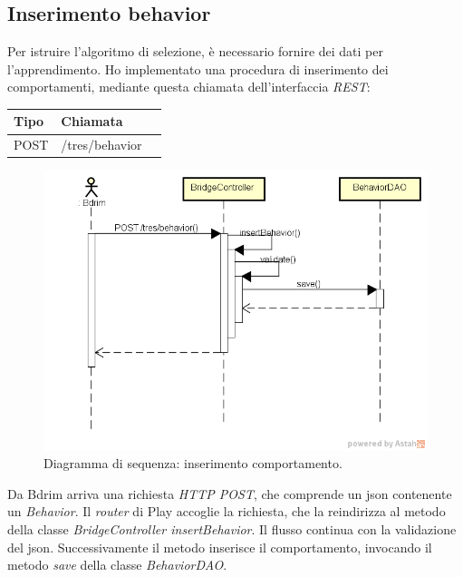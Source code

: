 \subsection{Inserimento behavior}
Per istruire l'algoritmo di selezione, è necessario fornire dei dati per l'apprendimento. Ho implementato una procedura di inserimento dei comportamenti, mediante questa chiamata dell'interfaccia \emph{REST}:
\def\arraystretch{1.5}
\begin{longtable}{|p{2.5cm}|p{5cm}|l|}
\hline
\textbf{Tipo} &	\textbf{Chiamata}	\\\hline
POST	&	/tres/behavior	 \\\hline
\end{longtable}
\begin{figure}[h]
\centering
\includegraphics[scale=0.42]{immagini/DSinsertBeh}
\caption{Diagramma di sequenza: inserimento comportamento.}
\label{fig:seq-inserimentobeh}
\end{figure}
Da Bdrim arriva una richiesta \emph{HTTP POST}, che comprende un \gls{json} contenente un \emph{Behavior}. Il \emph{router} di Play accoglie la richiesta, che la reindirizza al metodo della classe \emph{BridgeController insertBehavior}. Il flusso continua con la validazione del \gls{json}. Successivamente il metodo inserisce il comportamento, invocando il metodo \emph{save} della classe \emph{BehaviorDAO}. 


